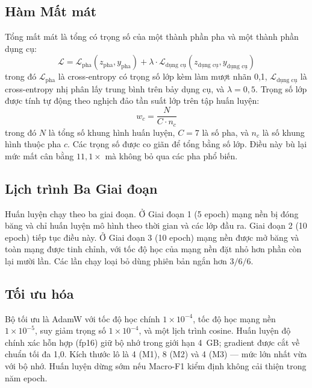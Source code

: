 \subsection{Hàm Mất mát}

Tổng mất mát là tổng có trọng số của một thành phần pha và một thành phần dụng cụ:
\begin{equation}
\mathcal{L} = \mathcal{L}_{\text{pha}}(z_{\text{pha}}, y_{\text{pha}}) + \lambda \cdot \mathcal{L}_{\text{dụng cụ}}(z_{\text{dụng cụ}}, y_{\text{dụng cụ}})
\label{eq:vn_total_loss}
\end{equation}
trong đó $\mathcal{L}_{\text{pha}}$ là cross-entropy có trọng số lớp kèm làm mượt nhãn 0,1, $\mathcal{L}_{\text{dụng cụ}}$ là cross-entropy nhị phân lấy trung bình trên bảy dụng cụ, và $\lambda = 0{,}5$. Trọng số lớp được tính tự động theo nghịch đảo tần suất lớp trên tập huấn luyện:
\begin{equation}
w_c = \frac{N}{C \cdot n_c}
\label{eq:vn_class_weight}
\end{equation}
trong đó $N$ là tổng số khung hình huấn luyện, $C = 7$ là số pha, và $n_c$ là số khung hình thuộc pha $c$. Các trọng số được co giãn để tổng bằng số lớp. Điều này bù lại mức mất cân bằng $11{,}1\times$ mà không bỏ qua các pha phổ biến.

\subsection{Lịch trình Ba Giai đoạn}

Huấn luyện chạy theo ba giai đoạn. Ở Giai đoạn 1 (5 epoch) mạng nền bị đóng băng và chỉ huấn luyện mô hình theo thời gian và các lớp đầu ra. Giai đoạn 2 (10 epoch) tiếp tục điều này. Ở Giai đoạn 3 (10 epoch) mạng nền được mở băng và toàn mạng được tinh chỉnh, với tốc độ học của mạng nền đặt nhỏ hơn phần còn lại mười lần. Các lần chạy loại bỏ dùng phiên bản ngắn hơn $3/6/6$.

\subsection{Tối ưu hóa}

Bộ tối ưu là AdamW với tốc độ học chính $1\times10^{-4}$, tốc độ học mạng nền $1\times10^{-5}$, suy giảm trọng số $1\times10^{-4}$, và một lịch trình cosine. Huấn luyện độ chính xác hỗn hợp (fp16) giữ bộ nhớ trong giới hạn 4~GB; gradient được cắt về chuẩn tối đa 1,0. Kích thước lô là 4 (M1), 8 (M2) và 4 (M3) --- mức lớn nhất vừa với bộ nhớ. Huấn luyện dừng sớm nếu Macro-F1 kiểm định không cải thiện trong năm epoch.

